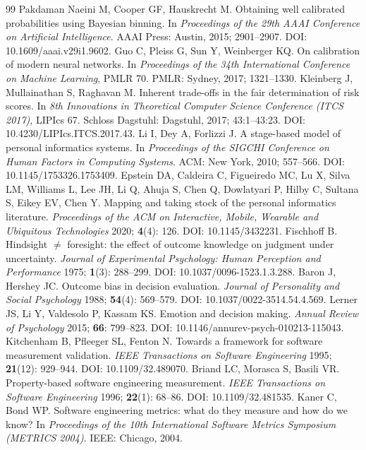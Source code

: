 \begin{thebibliography}{99}
 Pakdaman Naeini M, Cooper GF, Hauskrecht M. Obtaining well calibrated probabilities using Bayesian binning. In \emph{Proceedings of the 29th AAAI Conference on Artificial Intelligence}. AAAI Press: Austin, 2015; 2901--2907. DOI: 10.1609/aaai.v29i1.9602.
 Guo C, Pleiss G, Sun Y, Weinberger KQ. On calibration of modern neural networks. In \emph{Proceedings of the 34th International Conference on Machine Learning}, PMLR 70. PMLR: Sydney, 2017; 1321--1330.
 Kleinberg J, Mullainathan S, Raghavan M. Inherent trade-offs in the fair determination of risk scores. In \emph{8th Innovations in Theoretical Computer Science Conference (ITCS 2017)}, LIPIcs 67. Schloss Dagstuhl: Dagstuhl, 2017; 43:1--43:23. DOI: 10.4230/LIPIcs.ITCS.2017.43.
 Li I, Dey A, Forlizzi J. A stage-based model of personal informatics systems. In \emph{Proceedings of the SIGCHI Conference on Human Factors in Computing Systems}. ACM: New York, 2010; 557--566. DOI: 10.1145/1753326.1753409.
 Epstein DA, Caldeira C, Figueiredo MC, Lu X, Silva LM, Williams L, Lee JH, Li Q, Ahuja S, Chen Q, Dowlatyari P, Hilby C, Sultana S, Eikey EV, Chen Y. Mapping and taking stock of the personal informatics literature. \emph{Proceedings of the ACM on Interactive, Mobile, Wearable and Ubiquitous Technologies} 2020; \textbf{4}(4): 126. DOI: 10.1145/3432231.
 Fischhoff B. Hindsight $\neq$ foresight: the effect of outcome knowledge on judgment under uncertainty. \emph{Journal of Experimental Psychology: Human Perception and Performance} 1975; \textbf{1}(3): 288--299. DOI: 10.1037/0096-1523.1.3.288.
 Baron J, Hershey JC. Outcome bias in decision evaluation. \emph{Journal of Personality and Social Psychology} 1988; \textbf{54}(4): 569--579. DOI: 10.1037/0022-3514.54.4.569.
 Lerner JS, Li Y, Valdesolo P, Kassam KS. Emotion and decision making. \emph{Annual Review of Psychology} 2015; \textbf{66}: 799--823. DOI: 10.1146/annurev-psych-010213-115043.
 Kitchenham B, Pfleeger SL, Fenton N. Towards a framework for software measurement validation. \emph{IEEE Transactions on Software Engineering} 1995; \textbf{21}(12): 929--944. DOI: 10.1109/32.489070.
 Briand LC, Morasca S, Basili VR. Property-based software engineering measurement. \emph{IEEE Transactions on Software Engineering} 1996; \textbf{22}(1): 68--86. DOI: 10.1109/32.481535.
 Kaner C, Bond WP. Software engineering metrics: what do they measure and how do we know? In \emph{Proceedings of the 10th International Software Metrics Symposium (METRICS 2004)}. IEEE: Chicago, 2004.

\end{thebibliography}
